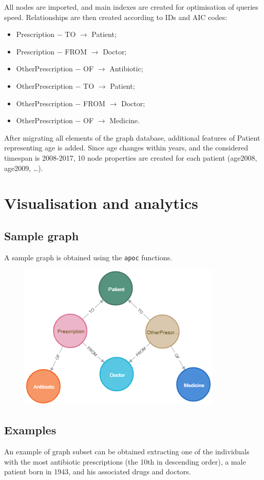 All nodes are imported, and main indexes are created for optimisation of queries speed. Relationships are then created according to IDs and AIC codes:
\begin{itemize}
	\item Prescription $-$ TO $\rightarrow$ Patient;
	\item Prescription $-$ FROM $\rightarrow$ Doctor;
	\item OtherPrescription $-$ OF $\rightarrow$ Antibiotic;
	\item OtherPrescription $-$ TO $\rightarrow$ Patient;
	\item OtherPrescription $-$ FROM $\rightarrow$ Doctor;
	\item OtherPrescription $-$ OF $\rightarrow$ Medicine.
\end{itemize}

After migrating all elements of the graph database, additional features of Patient representing age is added. Since age changes within years, and the considered timespan is 2008-2017, 10 node properties are created for each patient (age2008, age2009, \dots). %

\section{Visualisation and analytics}
\subsection{Sample graph}
A sample graph is obtained using the \texttt{apoc} functions.

\begin{figure}[h]
	\centering
	\includegraphics[scale=0.5]{./images/sample-graph.png}
\end{figure}


\subsection{Examples}
An example of graph subset can be obtained extracting one of the individuals with the most antibiotic prescriptions (the 10th in descending order), a male patient born in 1943, and his associated drugs and doctors.

